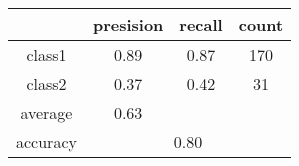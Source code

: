 
    \begin{tabular}{ | c | c | c | c | }
	\hline
	         &presision & recall & count \\ \hline
	class1   & 0.89    & 0.87  & 170 \\ \hline
	class2   & 0.37    & 0.42  & 31 \\ \hline
	average  & 0.63    &        &       \\
	\hline
	accuracy & \multicolumn{3}{c|}{0.80}\\
	\hline
    \end{tabular}